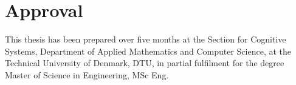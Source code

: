 \section*{Approval}
This thesis has been prepared over five months at the Section for Cognitive Systems, Department of Applied Mathematics and Computer Science, at the Technical University of Denmark, DTU, in partial fulfilment for the degree Master of Science in Engineering, MSc Eng. 


\vfill

\begin{center}
\namesigdate{\thesisauthor~-~\studentnumber}
\end{center}

\vfill

